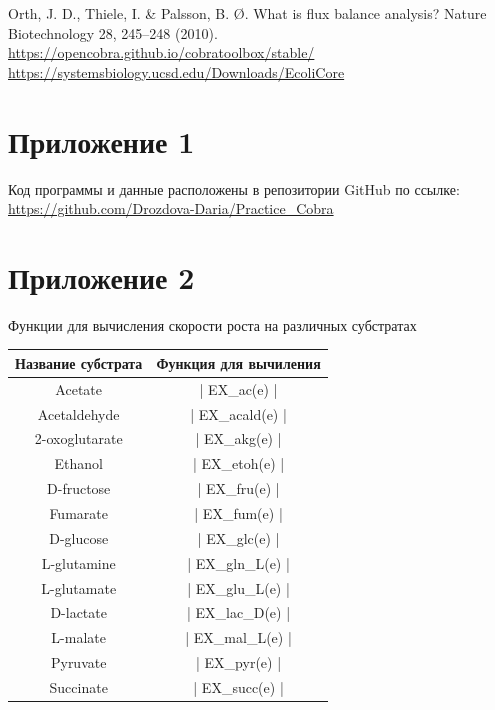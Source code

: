 \documentclass[a4paper, 12pt]{article}
\begin{document}
\newpage
{}
\begin{thebibliography}{}
     Orth, J. D., Thiele, I. & Palsson, B. Ø. What is flux balance analysis? Nature Biotechnology 28, 245–248 (2010).
     \url{https://opencobra.github.io/cobratoolbox/stable/}
     \url{https://systemsbiology.ucsd.edu/Downloads/EcoliCore}
\end{thebibliography}

\newpage
\section*{Приложение 1} \label{pr}

Код программы и данные расположены в репозитории GitHub по ссылке: \url{https://github.com/Drozdova-Daria/Practice_Cobra}

\newpage
\section*{Приложение 2} \label{pr:2}

Функции для вычисления скорости роста на различных субстратах

\begin{table}[H]
\begin{tabular}{ |c|c| }
\hline
Название субстрата & Функция для вычиления \\ \hline
Acetate            & | EX_ac(e) |          \\ \hline
Acetaldehyde       & | EX_acald(e) |       \\ \hline
2-oxoglutarate     & | EX_akg(e) |         \\ \hline
Ethanol            & | EX_etoh(e) |        \\ \hline
D-fructose         & | EX_fru(e) |         \\ \hline
Fumarate           & | EX_fum(e) |         \\ \hline
D-glucose          & | EX_glc(e) |         \\ \hline
L-glutamine        & | EX_gln_L(e) |       \\ \hline
L-glutamate        & | EX_glu_L(e) |       \\ \hline
D-lactate          & | EX_lac_D(e) |       \\ \hline
L-malate           & | EX_mal_L(e) |       \\ \hline
Pyruvate           & | EX_pyr(e) |         \\ \hline
Succinate          & | EX_succ(e) |        \\ \hline
\end{tabular}
\end{table}
\end{document}
